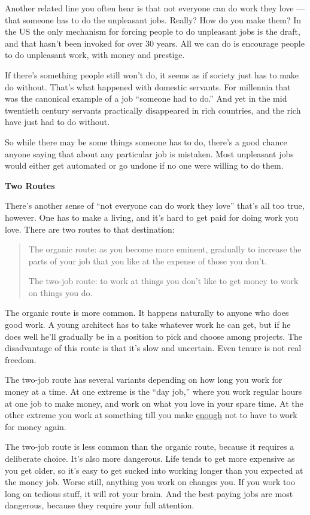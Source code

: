 \documentclass[12pt]{book}
\begin{document}
Another related line you often hear is that not everyone can do work
they love --- that someone has to do the unpleasant jobs. Really? How do
you make them? In the US the only mechanism for forcing people to do
unpleasant jobs is the draft, and that hasn't been invoked for over 30
years. All we can do is encourage people to do unpleasant work, with
money and prestige.

If there's something people still won't do, it seems as if society just
has to make do without. That's what happened with domestic servants. For
millennia that was the canonical example of a job ``someone had to do.''
And yet in the mid twentieth century servants practically disappeared in
rich countries, and the rich have just had to do without.

So while there may be some things someone has to do, there's a good
chance anyone saying that about any particular job is mistaken. Most
unpleasant jobs would either get automated or go undone if no one were
willing to do them.

\textbf{Two Routes}

There's another sense of ``not everyone can do work they love'' that's
all too true, however. One has to make a living, and it's hard to get
paid for doing work you love. There are two routes to that destination:

\begin{quote}
The organic route: as you become more eminent, gradually to increase the
parts of your job that you like at the expense of those you don't.

The two-job route: to work at things you don't like to get money to work
on things you do.
\end{quote}

The organic route is more common. It happens naturally to anyone who
does good work. A young architect has to take whatever work he can get,
but if he does well he'll gradually be in a position to pick and choose
among projects. The disadvantage of this route is that it's slow and
uncertain. Even tenure is not real freedom.

The two-job route has several variants depending on how long you work
for money at a time. At one extreme is the ``day job,'' where you work
regular hours at one job to make money, and work on what you love in
your spare time. At the other extreme you work at something till you
make \href{wealth.html}{enough} not to have to work for money again.

The two-job route is less common than the organic route, because it
requires a deliberate choice. It's also more dangerous. Life tends to
get more expensive as you get older, so it's easy to get sucked into
working longer than you expected at the money job. Worse still, anything
you work on changes you. If you work too long on tedious stuff, it will
rot your brain. And the best paying jobs are most dangerous, because
they require your full attention.
\end{document}
